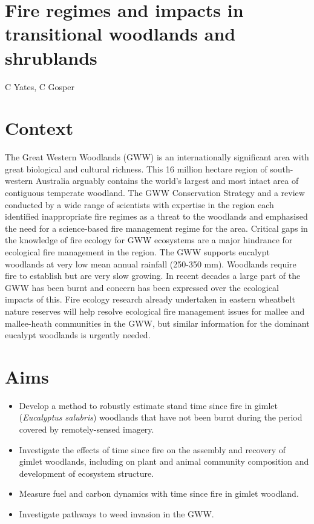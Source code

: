 \documentclass[version=last,
    paper=a4, %
    10pt, %
    usenames,
    dvipsnames,
    oneside, %
    headings=openany, %
    DIV=15 %
]{scrbook}
\begin{document}
\section*{Fire regimes and impacts in transitional woodlands and shrublands
}

C Yates, C Gosper


\section*{Context}
The Great Western Woodlands (GWW) is an internationally significant area
with great biological and cultural richness. This 16 million hectare
region of south-western Australia arguably contains the world's largest
and most intact area of contiguous temperate woodland. The GWW
Conservation Strategy and a review conducted by a wide range of
scientists with expertise in the region each identified inappropriate
fire regimes as a threat to the woodlands and emphasised the need for a
science-based fire management regime for the area. Critical gaps in the
knowledge of fire ecology for GWW ecosystems are a major hindrance for
ecological fire management in the region. The GWW supports eucalypt
woodlands at very low mean annual rainfall (250-350 mm). Woodlands
require fire to establish but are very slow growing. In recent decades a
large part of the GWW has been burnt and concern has been expressed over
the ecological impacts of this. Fire ecology research already undertaken
in eastern wheatbelt nature reserves will help resolve ecological fire
management issues for mallee and mallee-heath communities in the GWW,
but similar information for the dominant eucalypt woodlands is urgently
needed.



\section*{Aims}
\begin{itemize}
\itemsep1pt\parskip0pt
\item
  Develop a method to robustly estimate stand time since fire in gimlet
  (\emph{Eucalyptus salubris}) woodlands that have not been burnt during
  the period covered by remotely-sensed imagery.
\item
  Investigate the effects of time since fire on the assembly and
  recovery of gimlet woodlands, including on plant and animal community
  composition and development of ecosystem structure.
\item
  Measure fuel and carbon dynamics with time since fire in gimlet
  woodland.
\item
  Investigate pathways to weed invasion in the GWW.
\end{itemize}
\end{document}
